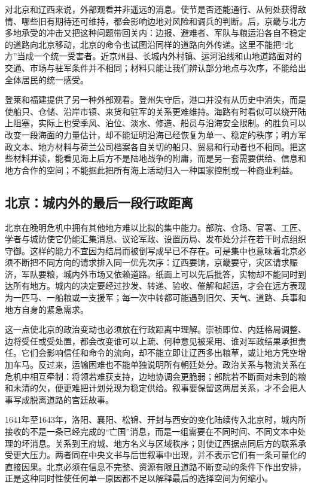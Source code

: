 对北京和辽西来说，外部观看并非遥远的消息。使节是否还能通行、从何处获得敌情、哪些旧有期待还可维持，都会影响边地对风险和调兵的判断。后，京畿与北方多地承受的冲击又把这种问题带回关内：边报、避难者、军队与粮运沿各自不稳定的道路向北京移动，北京的命令也试图沿同样的道路向外传递。这里不能把“北方”当成一个统一受害者。近京州县、长城内外村镇、运河沿线和山地道路面对的交通、市场与驻军条件并不相同；材料只能让我们辨认部分地点与次序，不能给出全体居民的统一感受。

登莱和福建提供了另一种外部观看。登州失守后，港口并没有从历史中消失，而是使船只、仓储、沿岸市镇、来货和驻军的关系更难维持。海路有时看似可以绕开陆上阻塞，实际上也受季风、泊位、淡水、修造、船员与沿海安全限制。的胜负可以改变一段海面的力量估计，却不能证明沿海已经恢复为单一、稳定的秩序；明方军政文本、地方材料与荷兰公司档案各自关切的船只、贸易和行动者也不相同。把这些材料并读，能看见海上后方不是陆地战争的附庸，而是另一套需要供给、信息和地方合作的空间；不能据此把所有海上活动归入一种国家控制或一种商业利益。

\subsection{北京：城内外的最后一段行政距离}

北京在晚明危机中拥有其他地方难以比拟的集中能力。部院、仓场、官署、工匠、学者与城防使它仍能汇集消息、议论军政、设置历局、发布处分并在若干时点组织守御。这样的能力不宜因为结局而被倒写成早已不存在。可是集中也意味着北京必须不断把不同方向的请求排入同一优先次序：辽西要饷，京畿要守，灾区请求赈济，军队要粮，城内外市场又依赖道路。纸面上可以先后批答，实物却不能同时到达所有地方。城内的决定要经过抄发、转递、验收、催解和起运，才会在远方表现为一匹马、一船粮或一支援军；每一次中转都可能遇到旧欠、天气、道路、兵事和地方自身的紧急需求。

这一点使北京的政治变动也必须放在行政距离中理解。崇祯即位、内廷格局调整、边将受任或受处置，都会改变谁可以上疏、何种意见被采用、谁对军政结果承担责任。它们会影响信任和命令的流向，却不能立即让辽西多出粮草，或让地方凭空增加车马。反过来，运输困难也不能单独说明所有朝廷处分。政治关系与物流关系在危机中相互牵制：将领若难获支持，边地协调会更脆弱；部院若不断面对未到的粮和未清的欠，便更难把计划兑现为稳定供给。叙事要保留这两层关系，才不会把人事写成脱离道路的宫廷故事。

1641年至1643年，洛阳、襄阳、松锦、开封与西安的变化陆续传入北京时，城内所接收的不是一条已经完成的“亡国”消息，而是一组需要在不同时间、不同文本中处理的坏消息。关系到王府城、地方名义与区域秩序；则使辽西据点同后方的联系承受更大压力。两者同在中央文书与后世叙事中出现，并不表示它们有一条可量化的直接因果。北京必须在信息不完整、资源有限且道路不断变动的条件下作出安排，正是这种同时性使任何单一原因都不足以解释最后的选择空间为何缩小。

